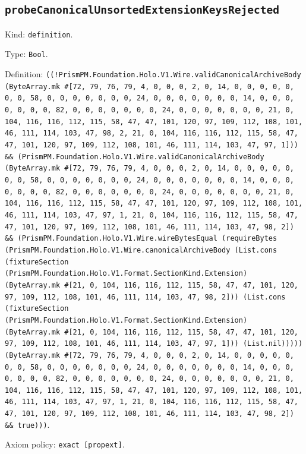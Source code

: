 \documentclass[11pt]{article}
\begin{document}
\subsection*{\texttt{probeCanonicalUnsortedExtensionKeysRejected}}
\noindent Kind: \texttt{definition}.\par
\noindent Type: \texttt{Bool}.\par
\noindent Definition: \texttt{((!PrismPM.Foundation.Holo.V1.Wire.validCanonicalArchiveBody (ByteArray.mk \#[72, 79, 76, 79, 4, 0, 0, 0, 2, 0, 14, 0, 0, 0, 0, 0, 0, 0, 58, 0, 0, 0, 0, 0, 0, 0, 24, 0, 0, 0, 0, 0, 0, 0, 14, 0, 0, 0, 0, 0, 0, 0, 82, 0, 0, 0, 0, 0, 0, 0, 24, 0, 0, 0, 0, 0, 0, 0, 21, 0, 104, 116, 116, 112, 115, 58, 47, 47, 101, 120, 97, 109, 112, 108, 101, 46, 111, 114, 103, 47, 98, 2, 21, 0, 104, 116, 116, 112, 115, 58, 47, 47, 101, 120, 97, 109, 112, 108, 101, 46, 111, 114, 103, 47, 97, 1])) \&\& (PrismPM.Foundation.Holo.V1.Wire.validCanonicalArchiveBody (ByteArray.mk \#[72, 79, 76, 79, 4, 0, 0, 0, 2, 0, 14, 0, 0, 0, 0, 0, 0, 0, 58, 0, 0, 0, 0, 0, 0, 0, 24, 0, 0, 0, 0, 0, 0, 0, 14, 0, 0, 0, 0, 0, 0, 0, 82, 0, 0, 0, 0, 0, 0, 0, 24, 0, 0, 0, 0, 0, 0, 0, 21, 0, 104, 116, 116, 112, 115, 58, 47, 47, 101, 120, 97, 109, 112, 108, 101, 46, 111, 114, 103, 47, 97, 1, 21, 0, 104, 116, 116, 112, 115, 58, 47, 47, 101, 120, 97, 109, 112, 108, 101, 46, 111, 114, 103, 47, 98, 2]) \&\& (PrismPM.Foundation.Holo.V1.Wire.wireBytesEqual (requireBytes (PrismPM.Foundation.Holo.V1.Wire.canonicalArchiveBody (List.cons (fixtureSection (PrismPM.Foundation.Holo.V1.Format.SectionKind.Extension) (ByteArray.mk \#[21, 0, 104, 116, 116, 112, 115, 58, 47, 47, 101, 120, 97, 109, 112, 108, 101, 46, 111, 114, 103, 47, 98, 2])) (List.cons (fixtureSection (PrismPM.Foundation.Holo.V1.Format.SectionKind.Extension) (ByteArray.mk \#[21, 0, 104, 116, 116, 112, 115, 58, 47, 47, 101, 120, 97, 109, 112, 108, 101, 46, 111, 114, 103, 47, 97, 1])) (List.nil))))) (ByteArray.mk \#[72, 79, 76, 79, 4, 0, 0, 0, 2, 0, 14, 0, 0, 0, 0, 0, 0, 0, 58, 0, 0, 0, 0, 0, 0, 0, 24, 0, 0, 0, 0, 0, 0, 0, 14, 0, 0, 0, 0, 0, 0, 0, 82, 0, 0, 0, 0, 0, 0, 0, 24, 0, 0, 0, 0, 0, 0, 0, 21, 0, 104, 116, 116, 112, 115, 58, 47, 47, 101, 120, 97, 109, 112, 108, 101, 46, 111, 114, 103, 47, 97, 1, 21, 0, 104, 116, 116, 112, 115, 58, 47, 47, 101, 120, 97, 109, 112, 108, 101, 46, 111, 114, 103, 47, 98, 2]) \&\& true)))}.\par
\noindent Axiom policy: \texttt{exact [propext]}.\par
\end{document}
